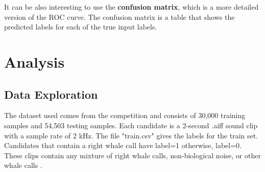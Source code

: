 \documentclass[]{article}
\begin{document}
It can be also interesting to use the \textbf{confusion matrix}, which is a more detailed version of the ROC curve. The confusion matrix is a table that shows the predicted labels for each of the true input labels.

\section{Analysis}\label{ii.-analysis}

\subsection{Data Exploration}\label{data-exploration}

The dataset used comes from the competition and consists of 30,000 training samples and 54,503 testing samples. Each candidate is a 2-second .aiff sound clip with a sample rate of 2 kHz. The file "train.csv" gives the labels for the train set. Candidates that contain a right whale call have label=1 otherwise, label=0. These clips contain any mixture of right whale calls, non-biological noise, or other whale calls \cite{CornellWeb, CornellWeb2}. 
\end{document}
